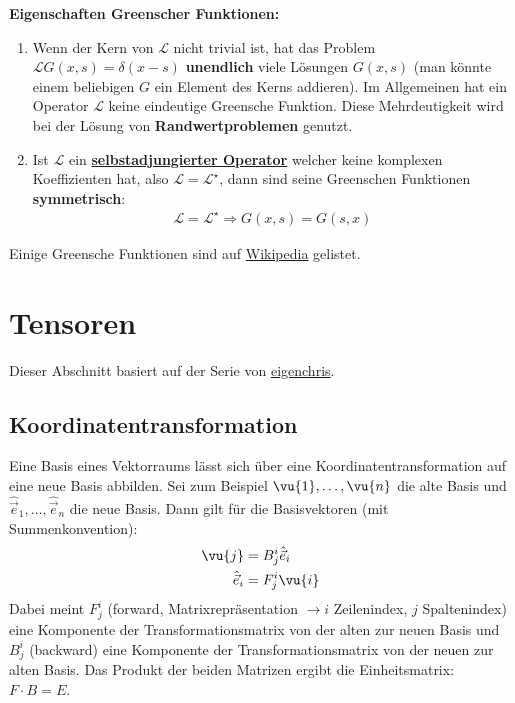 	\textbf{Eigenschaften Greenscher Funktionen:}
	\begin{enumerate}
		\item Wenn der Kern von $\mathcal{L}$ nicht trivial ist, hat das Problem $\mathcal{L}G(x,s)=\delta(x-s)$ \textbf{unendlich} viele Lösungen $G(x,s)$ (man könnte einem beliebigen $G$ ein Element des Kerns addieren).
		Im Allgemeinen hat ein Operator $\mathcal{L}$ keine eindeutige Greensche Funktion.
		Diese Mehrdeutigkeit wird bei der Lösung von \textbf{Randwertproblemen} genutzt.
		\item Ist $\mathcal{L}$ ein \href{https://de.wikipedia.org/wiki/Selbstadjungierter_Operator}{\textbf{selbstadjungierter Operator}} welcher keine komplexen Koeffizienten hat, also $\mathcal{L} = \mathcal{L}^\star$, dann sind seine Greenschen Funktionen \textbf{symmetrisch}:
		\begin{equation}\label{selbstadj}\begin{split}
				\boxed{\mathcal{L} = \mathcal{L}^\star \Rightarrow G(x,s) = G(s,x)  }
		\end{split}\end{equation}
	\end{enumerate}
Einige Greensche Funktionen sind auf \href{https://en.wikipedia.org/wiki/Green%27s_function}{Wikipedia} gelistet.
	

	
	
	\section{Tensoren}\label{tensoren}
	Dieser Abschnitt basiert auf der Serie von \href{https://www.youtube.com/playlist?list=PLJHszsWbB6hrkmmq57lX8BV-o-YIOFsiG}{eigenchris}.
	\subsection{Koordinatentransformation}
	Eine Basis eines Vektorraums lässt sich über eine Koordinatentransformation auf eine neue Basis abbilden. Sei zum Beispiel $\vu{1},\dots,\vu{n}$ die alte Basis und $\hat{\vec{e}}_1,\dots,\hat{\vec{e}}_n$ die neue Basis. Dann gilt für die Basisvektoren (mit Summenkonvention):
	\begin{equation}\label{unitvectrans}\begin{split}
			\vu{j} &=  B_{j}^i\hat{\vec{e}}_i\\
			\hat{\vec{e}}_i &=  F_{j}^i\vu{i}
	\end{split}\end{equation}
	Dabei meint $F_{j}^i$ (forward, Matrixrepräsentation $\to i$ Zeilenindex, $j$ Spaltenindex) eine Komponente der Transformationsmatrix von der alten zur neuen Basis und $B_{j}^i$ (backward) eine Komponente der Transformationsmatrix von der neuen zur alten Basis. Das Produkt der beiden Matrizen ergibt die Einheitsmatrix: $F\cdot B=E$. 
